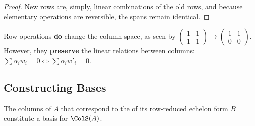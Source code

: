 \begin{proof}
New rows are, simply, linear combinations of the old rows, and because elementary operations are reversible, the spans remain identical.
\end{proof}

\begin{importantremark}
Row operations \textbf{do} change the column space, as seen by $\begin{pmatrix} 1 & 1 \\ 1 & 1 \end{pmatrix} \to \begin{pmatrix} 1 & 1 \\ 0 & 0 \end{pmatrix}$. However, they \textbf{preserve} the linear relations between columns: $\sum \alpha_{i} w_{i} = 0 \iff \sum \alpha_{i} w'_{i} = 0$.
\end{importantremark}

\subsection{Constructing Bases}

\begin{theorem}
\label{thm:basis_col_space}
The columns of $A$ that correspond to the  of its row-reduced echelon form $B$ constitute a basis for $\ColS(A)$.
\end{theorem}

